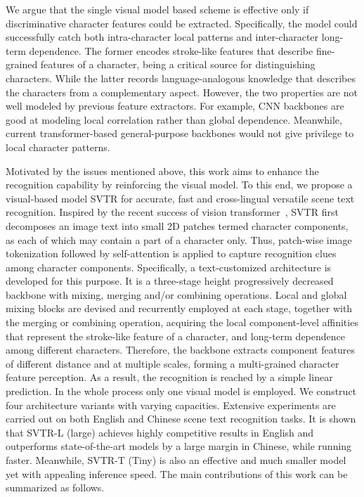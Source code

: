 \documentclass{article}
\begin{document}
We argue that the single visual model based scheme is effective only if discriminative character features could be extracted. Specifically, the model could successfully catch both intra-character local patterns and inter-character long-term dependence. The former encodes stroke-like features that describe fine-grained features of a character, being a critical source for distinguishing characters. While the latter records language-analogous knowledge that describes the characters from a complementary aspect. However, the two properties are not well modeled by previous feature extractors. For example, CNN backbones are good at modeling local correlation rather than global dependence. Meanwhile, current transformer-based general-purpose backbones would not give privilege to local character patterns.




Motivated by the issues mentioned above, this work aims to enhance the recognition capability by reinforcing the visual model. To this end, we propose a visual-based model SVTR for accurate, fast and cross-lingual versatile scene text recognition. 
Inspired by the recent success of vision transformer~\cite{dosovitskiy2020vit,liu2021Swin}, SVTR first decomposes an image text into small 2D patches termed character components, as each of which may contain a part of a character only. Thus, patch-wise image tokenization followed by self-attention is applied to capture recognition clues among character components. Specifically, a text-customized architecture is developed for this purpose. It is a three-stage height progressively decreased backbone with mixing, merging and/or combining operations. Local and global mixing blocks are devised and recurrently employed at each stage, together with the merging or combining operation, acquiring the local component-level affinities that represent the stroke-like feature of a character, and long-term dependence among different characters. Therefore, the backbone extracts component features of different distance and at multiple scales, forming a multi-grained character feature perception. As a result, the recognition is reached by a simple linear prediction. In the whole process only one visual model is employed. We construct four architecture variants with varying capacities. Extensive experiments are carried out on both English and Chinese scene text recognition tasks. It is shown that SVTR-L (large) achieves highly competitive results in English and outperforms state-of-the-art models by a large margin in Chinese, while running faster. Meanwhile, SVTR-T (Tiny) is also an effective and much smaller model yet with appealing inference speed. The main contributions of this work can be summarized as follows.
\end{document}
